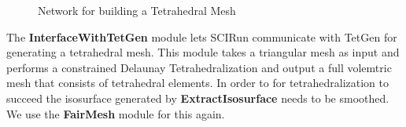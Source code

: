\documentclass[fleqn,11pt,openany]{book}
\begin{document}
\begin{figure}
\caption{Network for building a Tetrahedral Mesh}\label{fig:BuildMesh}
\end{figure}

The {\bf InterfaceWithTetGen} module lets SCIRun communicate with TetGen for generating a tetrahedral mesh. This module takes a triangular mesh as input and performs a constrained Delaunay Tetrahedralization and output a full volemtric mesh that consists of tetrahedral elements. In order to for tetrahedralization to succeed the isosurface generated by \textbf{ExtractIsosurface} needs to be smoothed. We use the {\bf FairMesh} module for this again. 
\end{document}
